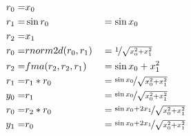 \begin{align*}
    r_0 = & x_0                                                                    \\
    r_1 = & \sin r_0           &  & = \sin x_0                                     \\
    r_2 = & x_1                                                                    \\
    r_0 = & rnorm2d(r_0, r_1)  &  & =\nicefrac{1}{\sqrt{x_0^2+x_1^2}}              \\
    r_2 = & fma(r_2, r_2, r_1) &  & =\sin x_0+x_1^2                                \\
    r_1 = & r_1*r_0            &  & =\nicefrac{\sin x_0}{\sqrt{x_0^2+x_1^2}}       \\
    y_0 = & r_1                &  & = \nicefrac{\sin x_0}{\sqrt{x_0^2+x_1^2}}      \\
    r_0 = & r_2*r_0            &  & =\nicefrac{\sin x_0+2x_1}{\sqrt{x_0^2+x_1^2}}  \\
    y_1 = & r_0                &  & = \nicefrac{\sin x_0+2x_1}{\sqrt{x_0^2+x_1^2}} \\
\end{align*}